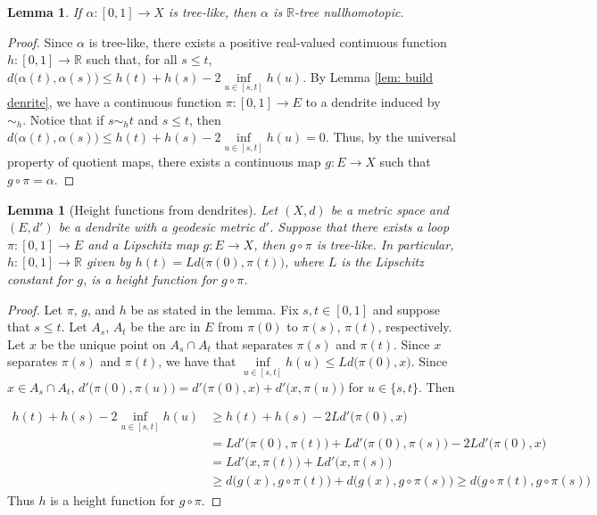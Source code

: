 \documentclass[11pt, leqno]{amsart}
\newtheorem{lemma}[theorem]{Lemma}
\theoremstyle{definition}\newtheorem{definition}[theorem]{Definition}
\begin{document}
\begin{lemma}\label{lem: dendrites from height functions}
    If $\alpha:[0,1]\to X$ is tree-like, then $\alpha$ is $\mathbb R$-tree nullhomotopic.
\end{lemma}    

    \begin{proof}
        Since $\alpha$ is tree-like, there exists a positive real-valued continuous function $h:[0,1]\to\mathbb R$  such that, for all $s\leq t$, $d\big(\alpha(t), \alpha(s)\big) \leq h(t)+h(s)-2\inf\limits_{u\in[s,t]} h(u)$.  By Lemma \ref{lem: build denrite}, we have a continuous function $\pi :[0,1]\to E$ to a dendrite induced by $\sim_h$.  Notice that if $s\sim_h t$ and $s\leq t$, then $d\big(\alpha(t), \alpha(s)\big) \leq h(t)+h(s)-2\inf\limits_{u\in[s,t]} h(u)= 0$.  Thus, by the universal property of quotient maps, there exists a continuous map $g:E \to X$ such that $g\circ \pi= \alpha$. 
    \end{proof}
    


\begin{lemma} [Height functions from dendrites]\label{lem: height functions from dendrites}
Let $(X,d)$ be a metric space and $(E,d')$ be a dendrite with a geodesic metric $d'$. Suppose that there exists a loop $\pi:[0,1]\to E$ and a Lipschitz map $g: E\to X$, then $g\circ\pi$ is tree-like.  In particular, $h:[0,1]\to \mathbb R$ given by $h(t) = Ld\big(\pi(0), \pi(t)\big)$, where $L$ is the Lipschitz constant for $g$, is a height function for $g\circ\pi$.
\end{lemma}

\begin{proof}
    Let $\pi$, $g$, and $h$ be as stated in the lemma.  Fix $s,t\in [0,1]$ and suppose that $s\leq t$.  Let $A_s$, $A_t$ be the arc in $E$ from $\pi(0)$ to $\pi(s)$, $\pi(t)$, respectively.  Let $x$ be the unique point on $A_s\cap A_t$ that separates $\pi(s)$ and $\pi(t)$.  Since $x$ separates $\pi(s)$ and $\pi(t)$,   we have that $\inf\limits_{u\in[s,t]} h(u)\leq Ld\big(\pi(0),x\big)$.  Since $x\in A_s\cap A_t$, $d'\big(\pi(0), \pi(u)\big) = d'\big(\pi(0), x\big)+d'\big(x, \pi(u)\big)$ for $u\in \{s,t\}$.   %
    Then
    
    \begin{align*}
        h(t) + h(s) - 2\inf\limits_{u\in[s,t]} h(u)&\geq h(t) + h(s) - 2Ld'\big(\pi(0), x\big) \\
        &= Ld'\big(\pi(0), \pi(t)\big)+Ld'\big(\pi(0), \pi(s)\big)- 2Ld'\big(\pi(0), x\big)\\
        &=Ld'\big(x, \pi(t)\big)+Ld'\big(x, \pi(s)\big)\\
        &\geq d\big(g(x), g\circ\pi(t)\big)+d\big(g(x), g\circ\pi(s)\big)\geq d\big(g\circ\pi(t), g\circ\pi(s)\big)
    \end{align*}
    Thus $h$ is a height function for $g\circ\pi$.
    
\end{proof}
\end{document}
